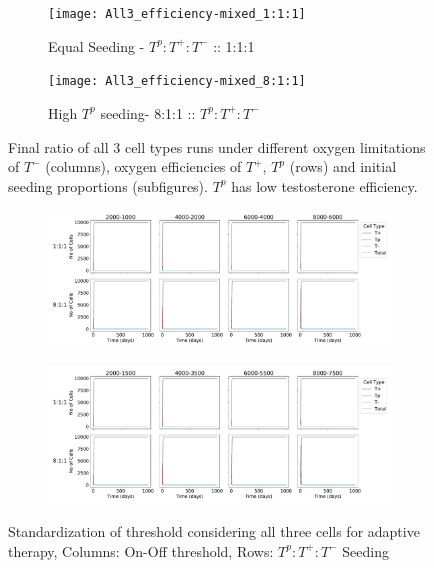\begin{figure}[h!]
  \centering
  \begin{subfigure}[b]{\textwidth}
    \centering
    \texttt{[image: All3\_efficiency-mixed\_1:1:1]}
    \caption{Equal Seeding - $T^p:T^+:T^-$ :: 1:1:1 }
    \label{fig_all3-mixed_1:1:1}
  \end{subfigure}
  \begin{subfigure}[b]{\textwidth}
    \centering
    \texttt{[image: All3\_efficiency-mixed\_8:1:1]}
    \caption{High $T^p$ seeding- 8:1:1 :: $T^p:T^+:T^-$}
    \label{fig_all3-mixed_8:1:1}
  \end{subfigure}
  \caption[Final ratio of all 3 cell types runs under different limitations for each cell type]{Final ratio of all 3 cell types runs under different oxygen limitations of $T^-$ (columns), oxygen efficiencies of $T^+$, $T^p$ (rows) and initial seeding proportions (subfigures). $T^p$ has low testosterone efficiency.}
  \label{fig_all3-mixed}
\end{figure}

\begin{figure}[h!]
  \centering
  \begin{subfigure}[b]{\textwidth}
    \centering
    \includegraphics[width=\textwidth]{figures/All3_therapy-standardization-total}
  \end{subfigure}
  \begin{subfigure}[b]{\textwidth}
    \centering
    \includegraphics[width=\textwidth]{figures/All3_therapy-standardization-total-sw}
  \end{subfigure}
  \caption[Standardization of threshold conisdering all 3 cells for adaptive therapy]{Standardization of threshold considering all three cells for adaptive therapy, Columns: On-Off threshold, Rows: $T^p:T^+:T^-$ Seeding}
  \label{fig_therapy-AT_standardization-Total}
\end{figure}
